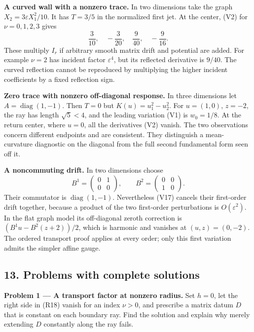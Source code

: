 \documentclass[
  11pt,
]{article}
\begin{document}
\textbf{A curved wall with a nonzero trace.} In two dimensions take the
graph \(X_2=3\varepsilon X_1^2/10\). It has \(T=3/5\) in the normalized
first jet. At the center, (V2) for \(\nu=0,1,2,3\) gives \[
             \frac3{10},\quad-\frac3{20},\quad
                      \frac9{40},\quad-\frac9{16}.           \tag{R35}
\] These multiply \(I_r\) if arbitrary smooth matrix drift and potential
are added. For example \(\nu=2\) has incident factor \(\varepsilon^4\),
but its reflected derivative is \(9/40\). The curved reflection cannot
be reproduced by multiplying the higher incident coefficients by a fixed
reflection sign.

\textbf{Zero trace with nonzero off-diagonal response.} In three
dimensions let \(A=\operatorname{diag}(1,-1)\). Then \(T=0\) but
\(K(u)=u_1^2-u_2^2\). For \(u=(1,0)\), \(z=-2\), the ray has length
\(\sqrt5<4\), and the leading variation (V1) is \(w_0=1/8\). At the
return center, where \(u=0\), all the derivatives (V2) vanish. The two
observations concern different endpoints and are consistent. They
distinguish a mean-curvature diagnostic on the diagonal from the full
second fundamental form seen off it.

\textbf{A noncommuting drift.} In two dimensions choose \[
 B^1=\begin{pmatrix}0&1\\0&0\end{pmatrix},\qquad
 B^2=\begin{pmatrix}0&0\\1&0\end{pmatrix}.                  \tag{R36}
\] Their commutator is \(\operatorname{diag}(1,-1)\). Nevertheless (V17)
cancels their first-order drift together, because a product of the two
first-order perturbations is \(O(\varepsilon^2)\). In the flat graph
model its off-diagonal zeroth correction is \((B^1u-B^2(z+2))/2\), which
is harmonic and vanishes at \((u,z)=(0,-2)\). The ordered transport
proof applies at every order; only this first variation admits the
simpler affine gauge.

\subsection{13. Problems with complete
solutions}\label{problems-with-complete-solutions}

\textbf{Problem 1 --- A transport factor at nonzero radius.} Set
\(h=0\), let the right side in (R18) vanish for an index \(\nu>0\), and
prescribe a matrix datum \(D\) that is constant on each boundary ray.
Find the solution and explain why merely extending \(D\) constantly
along the ray fails.
\end{document}
